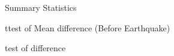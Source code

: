 \documentclass{beamer}
\begin{document}
\begin{frame}[plain]


\begin{table}
    \centering
    \caption{Summary Statistics}
    \label{Individual Summary}
    \scalebox{0.5}{ 
    
    }
\end{table}


\end{frame}




\begin{frame}[plain]
\renewcommand{\arraystretch}{1}
\tiny{
\begin{table}
    \centering
    \caption{ttest of Mean difference (Before Earthquake)}
    \label{Individual Summary}
    \resizebox{\columnwidth}{!}{ 
    
    }
\end{table}
}

\end{frame}

\begin{frame}[plain]
\renewcommand{\arraystretch}{1}
\tiny{
\begin{table}
    \centering
    \caption{test of difference}
    \label{Individual Summary}
    \resizebox{\columnwidth}{!}{ 
    
    }
\end{table}
}

\end{frame}
\end{document}
